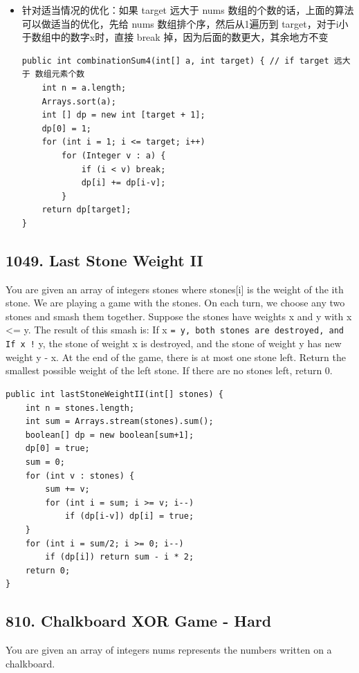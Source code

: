 \documentclass[9pt, b5paaper]{book}
\begin{document}
\begin{enumerate}
\begin{itemize}
\item 针对适当情况的优化：如果 target 远大于 nums 数组的个数的话，上面的算法可以做适当的优化，先给 nums 数组排个序，然后从1遍历到 target，对于i小于数组中的数字x时，直接 break 掉，因为后面的数更大，其余地方不变
\begin{verbatim}
public int combinationSum4(int[] a, int target) { // if target 远大于 数组元素个数
    int n = a.length;
    Arrays.sort(a);
    int [] dp = new int [target + 1];
    dp[0] = 1;
    for (int i = 1; i <= target; i++)
        for (Integer v : a) {
            if (i < v) break;
            dp[i] += dp[i-v];
        }
    return dp[target];
}
\end{verbatim}
\end{itemize}
\end{enumerate}


\subsection{1049. Last Stone Weight II}
\label{sec-1-4-29}
You are given an array of integers stones where stones[i] is the weight of the ith stone.
We are playing a game with the stones. On each turn, we choose any two stones and smash them together. Suppose the stones have weights x and y with x <= y. The result of this smash is:
If x \texttt{= y, both stones are destroyed, and
If x !} y, the stone of weight x is destroyed, and the stone of weight y has new weight y - x.
At the end of the game, there is at most one stone left.
Return the smallest possible weight of the left stone. If there are no stones left, return 0.
\begin{verbatim}
public int lastStoneWeightII(int[] stones) {
    int n = stones.length;
    int sum = Arrays.stream(stones).sum();
    boolean[] dp = new boolean[sum+1];
    dp[0] = true;
    sum = 0;
    for (int v : stones) {
        sum += v;
        for (int i = sum; i >= v; i--) 
            if (dp[i-v]) dp[i] = true;
    }
    for (int i = sum/2; i >= 0; i--) 
        if (dp[i]) return sum - i * 2;
    return 0;
}
\end{verbatim}

\subsection{810. Chalkboard XOR Game - Hard}
\label{sec-1-4-30}
You are given an array of integers nums represents the numbers written on a chalkboard.
\end{document}
